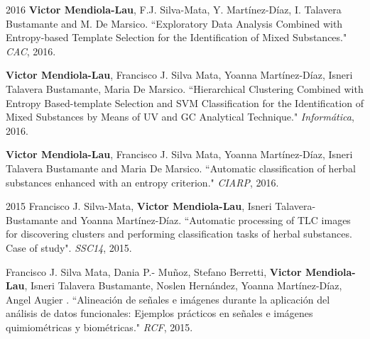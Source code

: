 \documentclass[]{friggeri-cv}
\begin{document}
\vspace{0.5cm}

\begin{paperlist}
  \paperentry
    {2016}
    {}
    {}
    {
		\textbf{Victor Mendiola-Lau}, F.J. Silva-Mata, Y. Martínez-Díaz, I. Talavera Bustamante and M. De Marsico. ``Exploratory Data Analysis Combined with Entropy-based Template Selection for the Identification of Mixed Substances."	 \emph{CAC}, 2016.
    }
\end{paperlist}

\begin{paperlist}
  \paperentry
    {}
    {}
    {}
    {
		\textbf{Victor Mendiola-Lau}, Francisco J. Silva Mata, Yoanna Martínez-Díaz, Isneri Talavera Bustamante, Maria De Marsico. ``Hierarchical Clustering Combined with Entropy Based-template Selection and SVM Classification for the Identification of Mixed Substances by Means of UV and GC Analytical Technique." \emph{Informática}, 2016.
    }
\end{paperlist}

\begin{paperlist}
  \paperentry
    {}
    {}
    {}
    {
		\textbf{Victor Mendiola-Lau}, Francisco J. Silva Mata, Yoanna Martínez-Díaz, Isneri Talavera Bustamante and Maria De Marsico. ``Automatic classification of herbal substances enhanced with an entropy criterion." \emph{CIARP}, 2016.
    }
\end{paperlist}

\vspace{0.5cm}

\begin{paperlist}
  \paperentry
    {2015}
    {}
    {}
    {
		Francisco J. Silva-Mata, \textbf{Victor Mendiola-Lau}, Isneri Talavera-Bustamante and Yoanna Martínez-Díaz. ``Automatic processing of TLC images for discovering clusters and performing classification tasks of herbal substances. Case of study". \emph{SSC14}, 2015.
    }
\end{paperlist}

\begin{paperlist}
  \paperentry
    {}
    {}
    {}
    {
		Francisco J. Silva Mata, Dania P.- Muñoz, Stefano Berretti, \textbf{Victor Mendiola-Lau}, Isneri Talavera Bustamante, Noslen Hernández, Yoanna Martínez-Díaz, Angel Augier . ``Alineación de señales e imágenes durante la aplicación del análisis de datos funcionales: Ejemplos prácticos en señales e imágenes quimiométricas y biométricas." \emph{RCF}, 2015.
    }
\end{paperlist}
\end{document}
